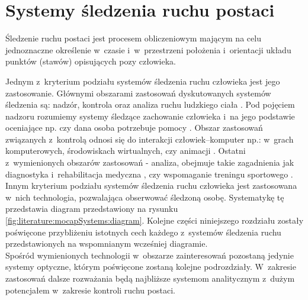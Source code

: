 \section{Systemy śledzenia ruchu postaci} \label{sec:literature:mocapSystems}

Śledzenie ruchu postaci jest procesem obliczeniowym mającym na celu jednoznaczne określenie w~czasie i~w~przestrzeni położenia i~orientacji układu punktów (stawów) opisujących pozy człowieka. 

Jednym z~kryterium podziału systemów śledzenia ruchu człowieka jest jego zastosowanie. Głównymi obszarami zastosowań dyskutowanych systemów śledzenia są: nadzór, kontrola oraz analiza ruchu ludzkiego ciała \cite{Moeslund2001}. Pod pojęciem nadzoru rozumiemy systemy śledzące zachowanie człowieka i~na jego podstawie oceniające np. czy dana osoba potrzebuje pomocy \cite{Kwolek, Kepski2016, Haritaoglu}. Obszar zastosowań związanych z~kontrolą odnosi się do interakcji człowiek--komputer np.: w~grach komputerowych, środowiskach wirtualnych, czy animacji \cite{Moeslund2001a}. Ostatni z~wymienionych obszarów zastosowań - analiza, obejmuje takie zagadnienia jak diagnostyka i~rehabilitacja medyczna  , czy wspomaganie treningu sportowego \cite{Neville2010,Noiumkar2013} .\\

Innym kryterium podziału systemów śledzenia ruchu człowieka jest zastosowana w~nich technologia, pozwalająca obserwować śledzoną osobę. Systematykę tę przedstawia diagram przedstawiony na rysunku \ref{fig:literature:mocapSystems:diagram}. Kolejne części niniejszego rozdziału zostały poświęcone przybliżeniu istotnych cech każdego z~systemów śledzenia ruchu przedstawionych na wspomnianym wcześniej diagramie. \\

Spośród wymienionych technologii w~obszarze zainteresowań pozostaną jedynie systemy optyczne, którym poświęcone zostaną kolejne podrozdziały. W~zakresie zastosowań dalsze rozważania będą najbliższe systemom analitycznym z~dużym potencjałem w~zakresie kontroli ruchu postaci.

